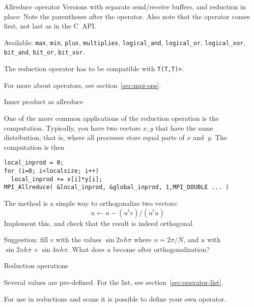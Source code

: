 \begin{mplnote}{Allreduce operator}
  Versions with separate send/receive buffers,
  and reduction in place:
  Note the parentheses after the operator.
  Also note that the operator comes first, not last as in the C~\ac{API}.

  Available: \lstinline{max}, \lstinline{min}, \lstinline{plus}, \lstinline{multiplies},
  \lstinline{logical_and}, \lstinline{logical_or}, \lstinline{logical_xor},
  \lstinline{bit_and}, \lstinline{bit_or}, \lstinline{bit_xor}.

\begin{mplimpl}
    The reduction operator has to be compatible with
    \lstinline+T(T,T)>+.
\end{mplimpl}
\end{mplnote}

For more about operators, see section~\ref{sec:mpi-ops}.

 {Inner product as allreduce}
\label{sec:dist-reduc}

One of the more common applications of the reduction operation
is the  computation. Typically, you have two vectors $x,y$
that have the same distribution, that is,
where all processes store equal parts of $x$ and~$y$.
The computation is then
\begin{lstlisting}
local_inprod = 0;
for (i=0; i<localsize; i++)
  local_inprod += x[i]*y[i];
MPI_Allreduce( &local_inprod, &global_inprod, 1,MPI_DOUBLE ... ) 
\end{lstlisting}

\begin{exercise}
  \label{ex:gramschmidt}
  The  method is a simple way to orthogonalize
  two vectors:
  \[ u \leftarrow u- (u^tv)/(u^tu) \]
  Implement this, and check that the result is indeed orthogonal.

  Suggestion: fill $v$ with the values $\sin 2nh\pi$ where $n=2\pi/N$,
  and $u$ with $\sin 2nh\pi + \sin 4nh\pi$. What does $u$ become after orthogonalization?
\end{exercise}

 {Reduction operations}
\label{sec:mpi:op-reduct}

Several  values are pre-defined. For the list,
see section~\ref{sec:operator-list}.

For use in reductions and scans it is possible to define your own operator.

